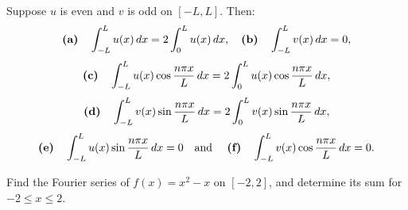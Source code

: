 \begin{theorem}
  \color{blue}
  \label{thmtype:11.2.5} Suppose $u$ is even and $v$ is odd on $[-L,L]$. Then:
  \[
    \mbox{{\bf (a)}\quad}\int_{-L}^{L}u(x)\,dx=2\int_{0}^{L}u(x)\,dx, \mbox{\quad {\bf (b)}\quad}\int_{-L}^{L}v(x)\,dx=0,
  \]
  \[
    \mbox{{\bf (c)}\quad}\int_{-L}^{L}u(x)\cos\frac{n\pi x}{L}\,dx=2\int_{0}^{L}u(x)\cos\frac{n\pi x}{L}\,dx,
  \]
  \[
    \mbox{{\bf (d)}\quad}\int_{-L}^{L}v(x)\sin\frac{n\pi x}{L}\,dx= 2\int_{0}^{L}v(x)\sin\frac{n\pi x}{L}\,dx,
  \]
  \[
    \mbox{{\bf (e)}\quad}\int_{-L}^{L}u(x)\sin\frac{n\pi x}{L}\,dx=0 \mbox{\quad and \quad {\bf (f)}\quad}\int_{-L}^{L}v(x)\cos\frac{n\pi x}{L}\,dx=0.
  \]
\end{theorem}

\begin{example}
  \label{example:11.2.3} \rm Find the Fourier series of $f(x)=x^{2}-x$ on $[-2,2]$, and determine
  its sum for $-2\le x\le2$.
\end{example}

